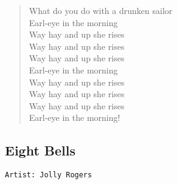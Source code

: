 \documentclass[11pt]{article}
\begin{document}
\begin{verse}
What do you do with a drunken sailor\\
Earl-eye in the morning\\
\vspace*{1em}
Way hay and up she rises\\
Way hay and up she rises\\
Way hay and up she rises\\
Earl-eye in the morning\\
\vspace*{1em}
Way hay and up she rises\\
Way hay and up she rises\\
Way hay and up she rises\\
Earl-eye in the morning!\\
\end{verse}
\clearpage
\subsection{Eight Bells}
\label{sec:org4129435}
\begin{verbatim}
Artist: Jolly Rogers
\end{verbatim}
\end{document}
